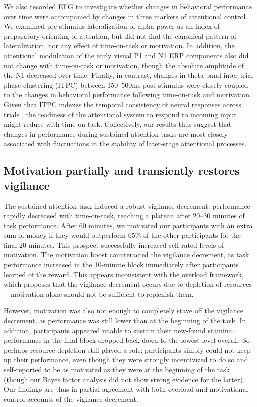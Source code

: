 \documentclass[11pt,]{memoir}
\begin{document}
We also recorded EEG to investigate whether changes in behavioral performance over time were accompanied by changes in three markers of attentional control. We examined pre-stimulus lateralization of alpha power as an index of preparatory orienting of attention, but did not find the canonical pattern of lateralization, nor any effect of time-on-task or motivation. In addition, the attentional modulation of the early visual P1 and N1 ERP components also did not change with time-on-task or motivation, though the absolute amplitude of the N1 decreased over time. Finally, in contrast, changes in theta-band inter-trial phase clustering (ITPC) between 150--500ms post-stimulus were closely coupled to the changes in behavioral performance following time-on-task and motivation. Given that ITPC indexes the temporal consistency of neural responses across trials \autocite{VanRullen2011}, the readiness of the attentional system to respond to incoming input might reduce with time-on-task. Collectively, our results thus suggest that changes in performance during sustained attention tasks are most closely associated with fluctuations in the stability of later-stage attentional processes.

\hypertarget{motivation-partially-and-transiently-restores-vigilance}{%
\subsection{Motivation partially and transiently restores vigilance}\label{motivation-partially-and-transiently-restores-vigilance}}

The sustained attention task induced a robust vigilance decrement: performance rapidly decreased with time-on-task, reaching a plateau after 20--30 minutes of task performance. After 60 minutes, we motivated our participants with an extra sum of money if they would outperform 65\% of the other participants for the final 20 minutes. This prospect successfully increased self-rated levels of motivation. The motivation boost counteracted the vigilance decrement, as task performance increased in the 10-minute block immediately after participants learned of the reward. This appears inconsistent with the overload framework, which proposes that the vigilance decrement occurs due to depletion of resources---motivation alone should not be sufficient to replenish them.

However, motivation was also not enough to completely stave off the vigilance decrement, as performance was still lower than at the beginning of the task. In addition, participants appeared unable to sustain their new-found stamina: performance in the final block dropped back down to the lowest level overall. So perhaps resource depletion still played a role: participants simply could not keep up their performance, even though they were strongly incentivized to do so and self-reported to be as motivated as they were at the beginning of the task (though our Bayes factor analysis did not show strong evidence for the latter). Our findings are thus in partial agreement with both overload and motivational control accounts of the vigilance decrement.
\end{document}
